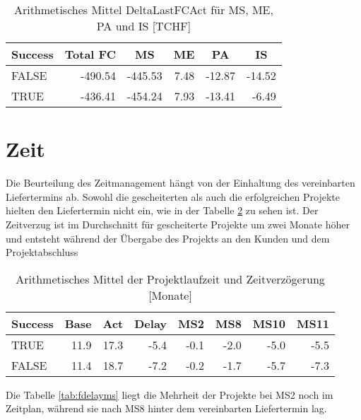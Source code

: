 \begin{table}[H]
	\centering
	\caption{Arithmetisches Mittel DeltaLastFCAct für MS, ME, PA und IS [TCHF]}
	\begin{tabular}{lrrrrr}
		\textbf{Success} & \multicolumn{1}{c}{\textbf{Total FC}} & \multicolumn{1}{c}{\textbf{MS}} & \multicolumn{1}{c}{\textbf{ME}} & \multicolumn{1}{c}{\textbf{PA}} & \multicolumn{1}{c}{\textbf{IS}}
		\\\hline
		FALSE & -490.54 & -445.53 & 7.48 & -12.87 & -14.52 \\
		TRUE  & -436.41 & -454.24 & 7.93 & -13.41 & -6.49\\
	\end{tabular}%
	\label{tab:mdeltalastfcact}%
\end{table}%
\newpage
\section{Zeit}
Die Beurteilung des Zeitmanagement hängt von der Einhaltung des vereinbarten Liefertermins ab. Sowohl die gescheiterten als auch die erfolgreichen Projekte hielten den Liefertermin nicht ein, wie in der Tabelle \ref{tab:mtime} zu sehen ist. Der Zeitverzug ist im Durchschnitt für gescheiterte Projekte um zwei Monate höher und entsteht während der Übergabe des Projekts  an den Kunden und dem Projektabschluss
\begin{table}[H]
	\centering
	\caption{Arithmetisches Mittel der Projektlaufzeit und Zeitverzögerung [Monate]}
	\begin{tabular}{lrrrrrrr}
		\toprule
		\textbf{Success} & \multicolumn{1}{l}{\textbf{Base}} & \multicolumn{1}{l}{\textbf{Act}} & \multicolumn{1}{l}{\textbf{Delay}} & \multicolumn{1}{l}{\textbf{MS2}} & \multicolumn{1}{l}{\textbf{MS8}} & \multicolumn{1}{l}{\textbf{MS10}} & \multicolumn{1}{l}{\textbf{MS11}} \\ 
		\midrule
		TRUE  & 11.9  & 17.3  & -5.4  & -0.1  & -2.0  & -5.0  & -5.5 \\
		FALSE & 11.4  & 18.7  & -7.2  & -0.2  & -1.7  & -5.7  & -7.3 \\
		\bottomrule
	\end{tabular}%
	\label{tab:mtime}%
\end{table}%
Die Tabelle \ref{tab:fdelayms} liegt die Mehrheit der Projekte bei MS2 noch im Zeitplan, während sie nach MS8 hinter dem vereinbarten Liefertermin lag.
